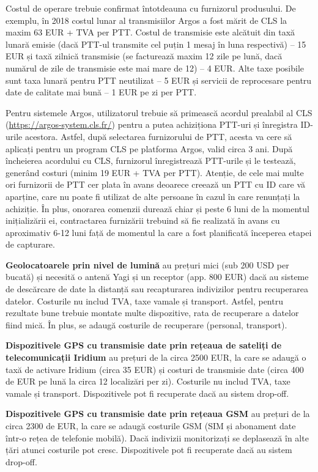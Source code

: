 \documentclass[11pt,onehalfspacing]{elife}
\begin{document}
Costul de operare trebuie confirmat întotdeauna cu furnizorul produsului. De exemplu, în 2018 costul lunar al transmisiilor Argos a fost mărit de CLS la maxim 63 EUR + TVA per PTT. Costul de transmisie este alcătuit din taxă lunară emisie (dacă PTT-ul transmite cel puțin 1 mesaj în luna respectivă) – 15 EUR și taxă zilnică transmisie (se facturează maxim 12 zile pe lună, dacă numărul de zile de transmisie este mai mare de 12) – 4 EUR. Alte taxe posibile sunt taxa lunară pentru PTT neutilizat – 5 EUR și servicii de reprocesare pentru date de calitate mai bună – 1 EUR pe zi per PTT.

Pentru sistemele Argos, utilizatorul trebuie să primească acordul prealabil al CLS (\url{https://argos-system.cls.fr/}) pentru a putea achiziționa PTT-uri și înregistra ID-urile acestora. Astfel, după selectarea furnizorului de PTT, acesta va cere să aplicați pentru un program CLS pe platforma Argos, valid circa 3 ani. După încheierea acordului cu CLS, furnizorul înregistrează PTT-urile și le testează, generând costuri (minim 19 EUR + TVA per PTT).
Atenție, de cele mai multe ori furnizorii de PTT cer plata în avans deoarece creează un PTT cu ID care vă aparține, care nu poate fi utilizat de alte persoane în cazul în care renunțați la achiziție. În plus, onorarea comenzii durează chiar și peste 6 luni de la momentul inițializării ei, contractarea furnizării trebuind să fie realizată în avans cu aproximativ 6-12 luni față de momentul la care a fost planificată începerea etapei de capturare.

\textbf{Geolocatoarele prin nivel de lumină} au prețuri mici (sub 200 USD per bucată) și necesită o antenă Yagi și un receptor (app. 800 EUR) dacă au sisteme de descărcare de date la distanță sau recapturarea indivizilor pentru recuperarea datelor. Costurile nu includ TVA, taxe vamale și transport. Astfel, pentru rezultate bune trebuie montate multe dispozitive, rata de recuperare a datelor fiind mică. În plus, se adaugă costurile de recuperare (personal, transport).

\textbf{Dispozitivele GPS cu transmisie date prin rețeaua de sateliți de telecomunicații Iridium} au prețuri de la circa 2500 EUR, la care se adaugă o taxă de activare Iridium (circa 35 EUR) și costuri de transmisie date (circa 400 de EUR pe lună la circa 12 localizări per zi). Costurile nu includ TVA, taxe vamale și transport. Dispozitivele pot fi recuperate dacă au sistem drop-off.

\textbf{Dispozitivele GPS cu transmisie date prin rețeaua GSM} au prețuri de la circa 2300 de EUR, la care se adaugă costurile GSM (SIM și abonament date într-o rețea de telefonie mobilă). Dacă indivizii monitorizați se deplasează în alte țări atunci costurile pot cresc. Dispozitivele pot fi recuperate dacă au sistem drop-off.
\end{document}
